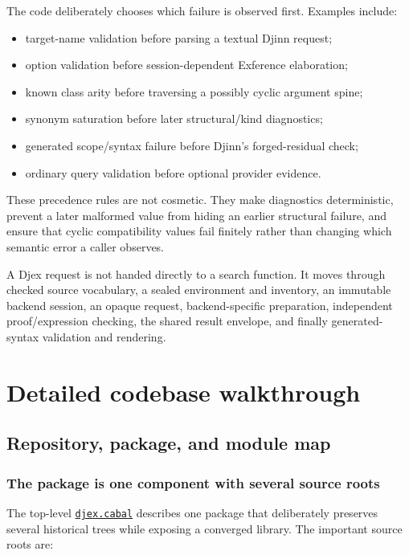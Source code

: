 \documentclass[10pt,letterpaper,oneside]{report}
\def\DjexBase{https://github.com/VladimirReshetnikov/Djex/blob/d3d9662598460316bdcd177ce6768c521e764aa8/}
\newcommand{\dpath}[1]{\href{\DjexBase#1}{\nolinkurl{#1}}}
\begin{document}
The code deliberately chooses which failure is observed first. Examples include:

\begin{itemize}
  \item target-name validation before parsing a textual Djinn request;
  \item option validation before session-dependent Exference elaboration;
  \item known class arity before traversing a possibly cyclic argument spine;
  \item synonym saturation before later structural/kind diagnostics;
  \item generated scope/syntax failure before Djinn's forged-residual check;
  \item ordinary query validation before optional provider evidence.
\end{itemize}

These precedence rules are not cosmetic. They make diagnostics deterministic, prevent a later malformed value from hiding an earlier structural failure, and ensure that cyclic compatibility values fail finitely rather than changing which semantic error a caller observes.

\begin{summarybox}
A Djex request is not handed directly to a search function. It moves through checked source vocabulary, a sealed environment and inventory, an immutable backend session, an opaque request, backend-specific preparation, independent proof/expression checking, the shared result envelope, and finally generated-syntax validation and rendering.
\end{summarybox}

\part{Detailed codebase walkthrough}

\chapter{Repository, package, and module map}\label{ch:djex-map}

\section{The package is one component with several source roots}

The top-level \dpath{djex.cabal} describes one package that deliberately preserves several historical trees while exposing a converged library. The important source roots are:
\end{document}
